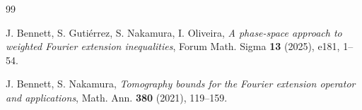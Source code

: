 \documentclass[11pt,reqno]{amsart}
\numberwithin{equation}{section}
\begin{document}
\begin{thebibliography}{99}









 J. Bennett, S. Guti\'{e}rrez, S. Nakamura, I. Oliveira, \textit{A phase-space approach to weighted Fourier extension inequalities}, Forum Math. Sigma \textbf{13} (2025), e181, 1--54.


 J. Bennett, S. Nakamura, \textit{Tomography bounds for the Fourier extension operator and applications}, Math. Ann. \textbf{380} (2021), 119--159.


\end{thebibliography}
\end{document}
